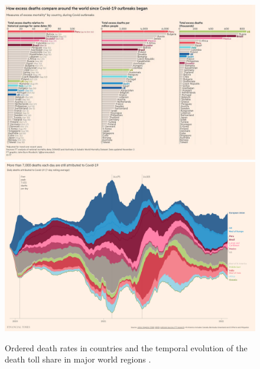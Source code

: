 \documentclass[article]{jdssv}\usepackage[]{graphicx}\usepackage[]{color}
\begin{document}
\begin{figure}\centering
\includegraphics[width=\linewidth]{Figures_Web/ft_deathrates_bar}\\
\includegraphics[width=\linewidth]{Figures_Web/ft_deathcounts_area}
\caption{Ordered death rates in countries and the temporal evolution of the death toll share in major world regions \citep{CoronavirusTrackerLatest2021}.}
\label{fig:ft-death-ranking}
\end{figure}
\end{document}
